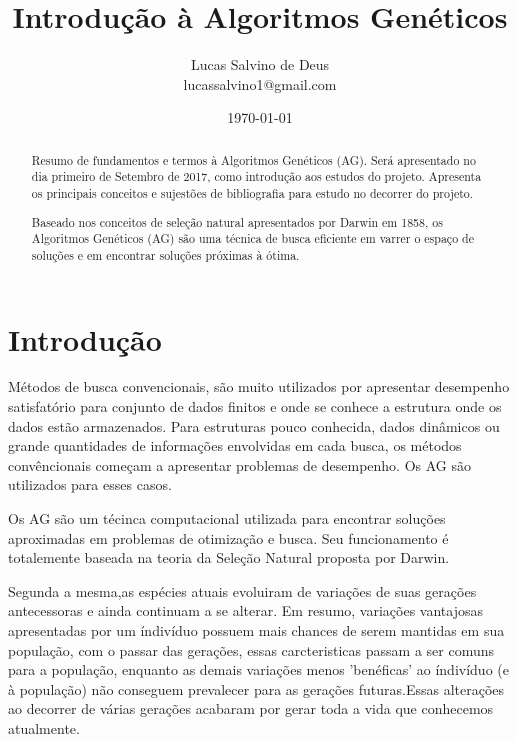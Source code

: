 \documentclass[12pt,twoside,openright,a4paper,brazil]{article}
\title{Introdução à Algoritmos Genéticos}
\author{Lucas Salvino de Deus \\ lucassalvino1@gmail.com}
\date{\today}
\begin{document}
	\begin{titlepage}%
	\maketitle
	\end{titlepage}
	
	\begin{abstract}%
		Resumo de fundamentos e termos à Algoritmos Genéticos (AG). Será apresentado no dia primeiro de Setembro de 2017, como introdução aos estudos do projeto. Apresenta os principais conceitos e sujestões de bibliografia para estudo no decorrer do projeto.
		
		Baseado nos conceitos de seleção natural apresentados por Darwin em 1858, os Algoritmos Genéticos (AG) são uma técnica de busca eficiente em varrer o espaço de soluções e em encontrar soluções próximas à ótima.
	\end{abstract}
	
	\section{Introdução}
		Métodos de busca convencionais, são muito utilizados por apresentar desempenho satisfatório para conjunto de dados finitos e onde se conhece a estrutura onde os dados estão armazenados. Para estruturas pouco conhecida, dados dinâmicos ou grande quantidades de informações envolvidas em cada busca, os métodos convêncionais começam a apresentar problemas de desempenho. Os AG são utilizados para esses casos.
		
		Os AG são um técinca computacional utilizada para encontrar soluções aproximadas em problemas de otimização e busca. Seu funcionamento é totalemente baseada na teoria da Seleção Natural proposta por Darwin.
		
		Segunda a mesma,as espécies atuais evoluiram de variações de suas gerações antecessoras e ainda continuam a se alterar. Em resumo, variações vantajosas apresentadas por um índivíduo possuem mais chances de serem mantidas em sua população, com o passar das gerações, essas carcteristicas passam a ser comuns para a população, enquanto as demais variações menos 'benéficas' ao índivíduo (e à população) não conseguem prevalecer para as gerações futuras.Essas alterações ao decorrer de várias gerações acabaram por gerar toda a vida que conhecemos atualmente.
			
\end{document}
